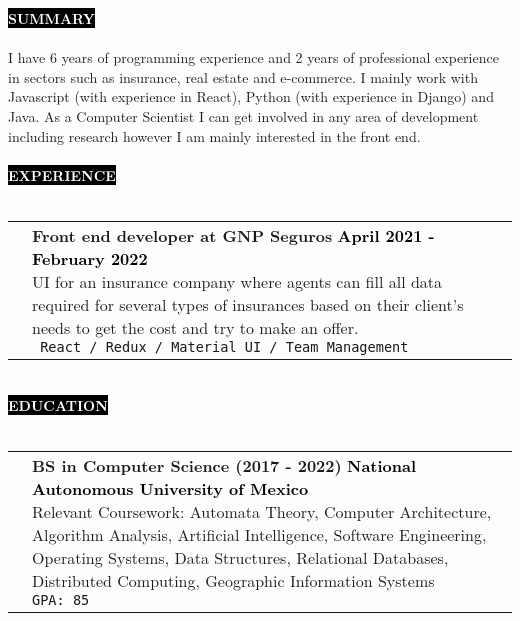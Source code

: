 \documentclass[11pt,A4]{article}
\makeatletter
\newcounter{a}
\newcounter{b}
\newcounter{c}
\newcommand{\cvsection}[1] {
	\textcolor{white}{\MakeUppercase{\textbf{#1}}}
}
\newcommand{\cvsect}[1]{
	\colorbox{black}{{\cvsection{#1}}}\\\\%
}
\newenvironment{entrylist}{%
	\begin{tabular*}{\textwidth}[t]{@{\extracolsep{\fill}}ll}
	}{%
	\end{tabular*}
}
\newcommand{\entry}[5]{%
	&\parbox[t]{17.5cm}{%
		\large\textbf{#1}%
		\hfill
		{\small \textbf{\textcolor{black}{#2}}}\\%
		\normalsize #4\\
		\texttt{#5}
	}\\\\}
\newcommand{\slashsep}{
	\hspace{2mm}/\hspace{2mm}
}
\makeatother
\begin{document}
	\cvsect{Summary}
	I have 6 years of programming experience and 2 years of professional experience in sectors such as insurance, real estate and e-commerce. I mainly work with Javascript (with experience in React), Python (with experience in Django) and Java. As a Computer Scientist I can get involved in any area of development including research however I am mainly interested in the front end. \\
	\\
	\cvsect{Experience}
	\begin{entrylist}
		\entry
		{Front end developer at GNP Seguros}
		{April 2021 - February 2022}
		{GNP Seguros}
		{UI for an insurance company where agents can fill all data required for several types of insurances based on their client's needs to get the cost and try to make an offer.}
		{ React \slashsep Redux \slashsep Material UI \slashsep Team Management}
		\entry
		{Full stack developer at M22}
		{October 2020 - February 2021}
		{M22}
		{UI for a real estate company where people can view details and availability of several places for make purchase agreement. All the data updates in real time and the content is modified from a Content Management System(CMS).}
		{React \slashsep Strapi JS \slashsep QGIS \slashsep GraphQL \slashsep PostgreSQL}
		\entry
		{Full stack developer at Ultra maratón sierra mixe}
		{January 2020 - September 2020}
		{Ultra maratón sierra mixe}
		{This is a client's project on the automation of the processes involved in the realization of a marathon race such as registration, marketing and payment.}
		{React \slashsep Google Firebase \slashsep Bootstrap}
		\entry
		{Full stack developer}
		{Summer 2018}
		{Copnap}
		{Mobile application for Android to help teachers and students to know if a number is prime or not, also the app can give you the list of prime numbers in a range and calculate the Euler's totient function.}
		{Android Studio \slashsep Flutter \slashsep Dart}
	\end{entrylist}
	\\
	\cvsect{Education}
	\begin{entrylist}
		\entry
		{BS in Computer Science (\small 2017 - 2022)}
		{National Autonomous University of Mexico }
		{UNAM, Faculty of Science}
		{Relevant Coursework: Automata Theory, Computer Architecture, Algorithm Analysis, Artificial Intelligence, Software Engineering, Operating Systems, Data Structures, Relational Databases, Distributed Computing, Geographic Information Systems} 
		{GPA: 85}
	\end{entrylist}
	\\
\end{document}
